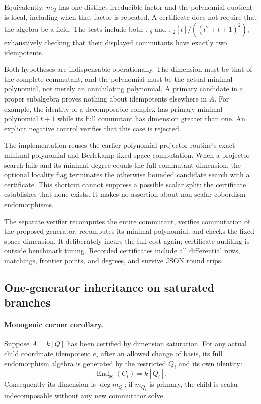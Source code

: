 Equivalently, $m_Q$ has one distinct irreducible factor and the polynomial
quotient is local, including when that factor is repeated. A certificate
does not require that the algebra be a field. The tests include both
$\mathbb F_8$ and $\mathbb F_2[t]/((t^2+t+1)^2)$, exhaustively checking that
their displayed commutants have exactly two idempotents.

Both hypotheses are indispensable operationally. The dimension must be that
of the complete commutant, and the polynomial must be the actual minimal
polynomial, not merely an annihilating polynomial. A primary candidate in a
proper subalgebra proves nothing about idempotents elsewhere in $A$.
For example, the identity of a decomposable complex has primary minimal
polynomial $t+1$ while its full commutant has dimension greater than one.
An explicit negative control verifies that this case is rejected.

The implementation reuses the earlier polynomial-projector routine's exact
minimal polynomial and Berlekamp fixed-space computation. When a projector
search fails and its minimal degree equals the full commutant dimension,
the optional locality flag terminates the otherwise bounded candidate
search with a certificate. This shortcut cannot suppress a possible scalar
split: the certificate establishes that none exists. It makes no assertion
about non-scalar cobordism endomorphisms.

The separate verifier recomputes the entire commutant, verifies commutation
of the proposed generator, recomputes its minimal polynomial, and checks
the fixed-space dimension. It deliberately incurs the full cost again;
certificate auditing is outside benchmark timing. Recorded certificates
include all differential rows, matchings, frontier points, and degrees,
and survive JSON round trips.

\subsection{One-generator inheritance on saturated branches}

\paragraph{Monogenic corner corollary.}
Suppose $A=k[Q]$ has been certified by dimension saturation. For any actual
child coordinate idempotent $e_i$ after an allowed change of basis, its full
endomorphism algebra is generated by the restricted $Q_i$ and its own
identity:
\[
 \operatorname{End}_{\mathrm{sc}}(C_i)=k[Q_i].
\]
Consequently its dimension is $\deg m_{Q_i}$; if $m_{Q_i}$ is primary, the
child is scalar indecomposable without any new commutator solve.

